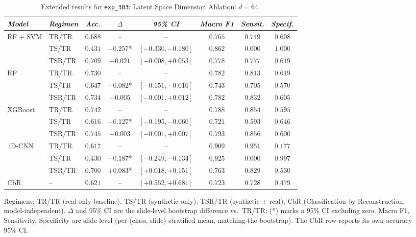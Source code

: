 \begin{table}[htp]
\centering
\scriptsize
\caption{Extended results for \texttt{exp\_303}: Latent Space Dimension Ablation: $d=64$.}
\label{tab:appendix_exp_303}
\begin{tabular*}{\textwidth}{@{\extracolsep{\fill}}llcccccc}
\toprule
\emph{Model} & \emph{Regimen} & \emph{Acc.} & \emph{$\Delta$} & \emph{95\% CI} & \emph{Macro F1} & \emph{Sensit.} & \emph{Specif.}\\
\midrule
\multirow{3}{*}{RF + SVM} & TR/TR & $0.688$ & -- & -- & $0.765$ & $0.749$ & $0.608$\\
 & TS/TR & $0.431$ & $-0.257$* & $[-0.330, -0.180]$ & $0.862$ & $0.000$ & $1.000$\\
 & TSR/TR & $0.709$ & $+0.021$ & $[-0.008, +0.053]$ & $0.778$ & $0.777$ & $0.619$\\
\midrule
\multirow{3}{*}{RF} & TR/TR & $0.730$ & -- & -- & $0.782$ & $0.813$ & $0.619$\\
 & TS/TR & $0.647$ & $-0.082$* & $[-0.151, -0.016]$ & $0.743$ & $0.705$ & $0.570$\\
 & TSR/TR & $0.734$ & $+0.005$ & $[-0.001, +0.012]$ & $0.782$ & $0.832$ & $0.605$\\
\midrule
\multirow{3}{*}{XGBoost} & TR/TR & $0.742$ & -- & -- & $0.788$ & $0.854$ & $0.595$\\
 & TS/TR & $0.616$ & $-0.127$* & $[-0.195, -0.060]$ & $0.721$ & $0.593$ & $0.646$\\
 & TSR/TR & $0.745$ & $+0.003$ & $[-0.001, +0.007]$ & $0.793$ & $0.856$ & $0.600$\\
\midrule
\multirow{3}{*}{1D-CNN} & TR/TR & $0.617$ & -- & -- & $0.909$ & $0.951$ & $0.177$\\
 & TS/TR & $0.430$ & $-0.187$* & $[-0.249, -0.134]$ & $0.925$ & $0.000$ & $0.997$\\
 & TSR/TR & $0.700$ & $+0.083$* & $[+0.018, +0.151]$ & $0.763$ & $0.829$ & $0.530$\\
\midrule
CbR & -- & $0.621$ & -- & $[+0.552, +0.681]$ & $0.723$ & $0.728$ & $0.479$\\
\bottomrule
\end{tabular*}
\small{Regimens: TR/TR (real-only baseline), TS/TR (synthetic-only), TSR/TR (synthetic + real), CbR (Classification by Reconstruction, model-independent). $\Delta$ and 95\% CI are the slide-level bootstrap difference vs.\ TR/TR; (*) marks a 95\% CI excluding zero. Macro F1, Sensitivity, Specificity are slide-level (per-(class, slide) stratified mean, matching the bootstrap). The CbR row reports its own accuracy 95\% CI.}
\end{table}

